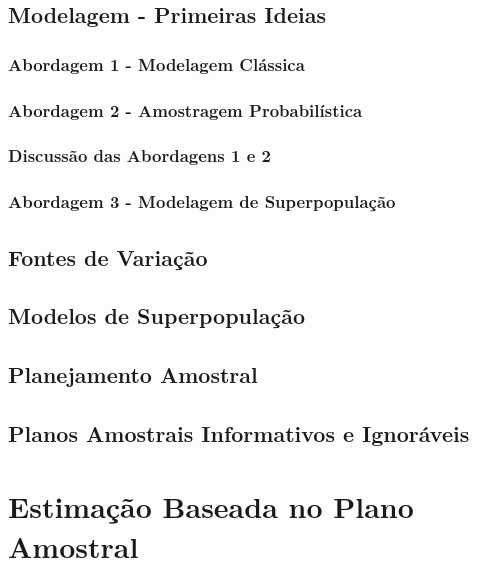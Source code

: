 \documentclass[]{book}
\theoremstyle{definition}
\theoremstyle{definition}
\theoremstyle{definition}
\theoremstyle{remark}
\begin{document}
\section{Modelagem - Primeiras Ideias}\label{classic}

\subsection{Abordagem 1 - Modelagem
Clássica}\label{abordagem-1---modelagem-classica}

\subsection{Abordagem 2 - Amostragem
Probabilística}\label{abordagem-2---amostragem-probabilistica}

\subsection{Discussão das Abordagens 1 e
2}\label{discussao-das-abordagens-1-e-2}

\subsection{Abordagem 3 - Modelagem de
Superpopulação}\label{modelsuperpop}

\section{Fontes de Variação}\label{fontes-de-variacao}

\section{Modelos de Superpopulação}\label{modelos-de-superpopulacao}

\section{Planejamento Amostral}\label{planamo}

\section{Planos Amostrais Informativos e Ignoráveis}\label{inform}

\chapter{Estimação Baseada no Plano Amostral}\label{capplanamo}
\end{document}
